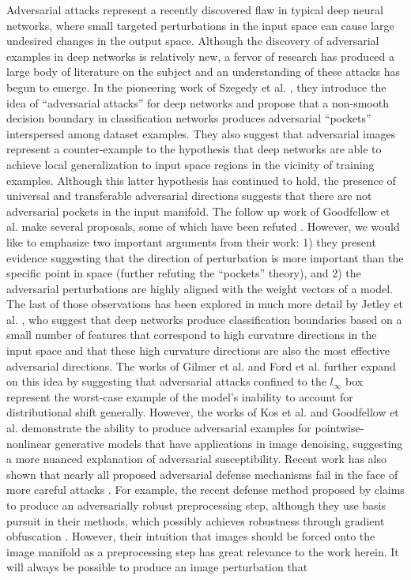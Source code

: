 Adversarial attacks represent a recently discovered flaw in typical deep neural networks, where small targeted perturbations in the input space can cause large undesired changes in the output space. Although the discovery of adversarial examples in deep networks is relatively new, a fervor of research has produced a large body of literature on the subject and an understanding of these attacks has begun to emerge. In the pioneering work of Szegedy et al. \citeyearpar{szegedy2013intriguing}, they introduce the idea of ``adversarial attacks'' for deep networks and propose that a non-smooth decision boundary in classification networks produces adversarial ``pockets'' interspersed among dataset examples. They also suggest that adversarial images represent a counter-example to the hypothesis that deep networks are able to achieve local generalization to input space regions in the vicinity of training examples. Although this latter hypothesis has continued to hold, the presence of universal and transferable adversarial directions \cite{moosavi2017universal} suggests that there are not adversarial pockets in the input manifold. The follow up work of Goodfellow et al. \citeyearpar{goodfellow2014explaining} make several proposals, some of which have been refuted \cite{jetley2018friends}. However, we would like to emphasize two important arguments from their work: 1) they present evidence suggesting that the direction of perturbation is more important than the specific point in space (further refuting the ``pockets'' theory), and 2) the adversarial perturbations are highly aligned with the weight vectors of a model. The last of those observations has been explored in much more detail by Jetley et al. \citeyearpar{jetley2018friends}, who suggest that deep networks produce classification boundaries based on a small number of features that correspond to high curvature directions in the input space and that these high curvature directions are also the most effective adversarial directions. The works of Gilmer et al. \citeyearpar{gilmer2018adversarial} and Ford et al. \citeyearpar{ford2019adversarial} further expand on this idea by suggesting that adversarial attacks confined to the $l_{\infty}$ box represent the worst-case example of the model's inability to account for distributional shift generally. However, the works of Kos et al. \citeyearpar{ford2019adversarial} and Goodfellow et al. \citeyearpar{goodfellow2014explaining} demonstrate the ability to produce adversarial examples for pointwise-nonlinear generative models that have applications in image denoising, suggesting a more nuanced explanation of adversarial susceptibility. Recent work has also shown that nearly all proposed adversarial defense mechanisms fail in the face of more careful attacks \cite{carlini2017towards, athalye2018obfuscated}.  For example, the recent defense method proposed by \cite{sun2018adversarial} claims to produce an adversarially robust preprocessing step, although they use basis pursuit in their methods, which possibly achieves robustness through gradient obfuscation \cite{athalye2018obfuscated}. However, their intuition that images should be forced onto the image manifold as a preprocessing step has great relevance to the work herein. It will always be possible to produce an image perturbation that 